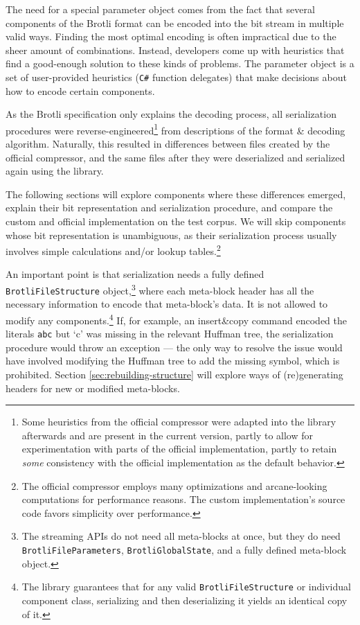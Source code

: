 \documentclass[english,master,dept460,male,cpp,cpdeclaration]{diploma}
\begin{document}
	The need for a special parameter object comes from the fact that several components of the Brotli format can be encoded into the bit stream in multiple valid ways. Finding the most optimal encoding is often impractical due to the sheer amount of combinations. Instead, developers come up with heuristics that find a good-enough solution to these kinds of problems. The parameter object is a set of user-provided heuristics (\verb|C#| function delegates) that make decisions about how to encode certain components.
	
	As the Brotli specification only explains the decoding process, all serialization procedures were reverse-engineered\footnote{Some heuristics from the official compressor were adapted into the library afterwards and are present in the current version, partly to allow for experimentation with parts of the official implementation, partly to retain \emph{some} consistency with the official implementation as the default behavior.} from descriptions of the format \& decoding algorithm. Naturally, this resulted in differences between files created by the official compressor, and the same files after they were deserialized and serialized again using the library.
	
	The following sections will explore components where these differences emerged, explain their bit representation and serialization procedure, and compare the custom and official implementation on the test corpus. We will skip components whose bit representation is unambiguous, as their serialization process usually involves simple calculations and/or lookup tables.\footnote{The official compressor employs many optimizations and arcane-looking computations for performance reasons. The custom implementation's source code favors simplicity over performance.}
	
	An important point is that serialization needs a fully defined \verb|BrotliFileStructure| object,\footnote{The streaming APIs do not need all meta-blocks at once, but they do need \texttt{BrotliFileParameters}, \texttt{BrotliGlobalState}, and a fully defined meta-block object.} where each meta-block header has all the necessary information to encode that meta-block's data. It is not allowed to modify any components.\footnote{The library guarantees that for any valid \texttt{BrotliFileStructure} or individual component class, serializing and then deserializing it yields an identical copy of it.} If, for example, an insert\&copy command encoded the literals \verb|abc| but \enquote*{c} was missing in the relevant Huffman tree, the serialization procedure would throw an exception --- the only way to resolve the issue would have involved modifying the Huffman tree to add the missing symbol, which is prohibited. Section \ref{sec:rebuilding-structure} will explore ways of (re)generating headers for new or modified meta-blocks.
	
\end{document}
